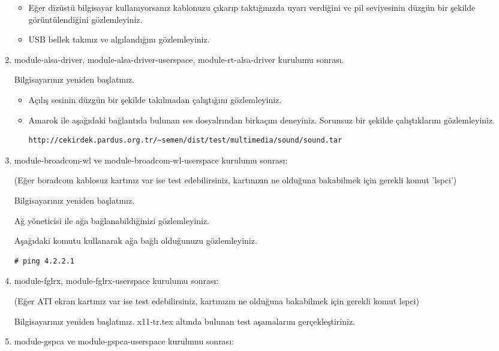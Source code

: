 \documentclass[a4paper,10pt]{article}
\begin{document}
\begin{enumerate}
\begin{itemize}
\item Eğer dizüstü bilgisayar kullanıyorsanız kablonuzu çıkarıp taktığınızda uyarı verdiğini ve pil seviyesinin düzgün bir şekilde görüntülendiğini gözlemleyiniz.
\item USB bellek takınız ve algılandığını gözlemleyiniz.
\end{itemize}

\item module-alsa-driver, module-alsa-driver-userspace, module-rt-alsa-driver kurulumu sonrası.

Bilgisayarınız yeniden başlatınız.
\begin{itemize}
\item Açılış sesinin düzgün bir şekilde takılmadan çalıştığını gözlemleyiniz.

\item Amarok ile aşağıdaki bağlantıda bulunan ses dosyalrından birkaçını deneyiniz. Sorunsuz bir şekilde çalıştıklarını gözlemleyiniz.
\begin{verbatim}
http://cekirdek.pardus.org.tr/~semen/dist/test/multimedia/sound/sound.tar 
\end{verbatim}

\end{itemize}

\item module-broadcom-wl ve module-broadcom-wl-userspace kurulumu sonrası: 

(Eğer boradcom kablosuz kartınız var ise test edebilirsiniz, kartınızın ne olduğuna bakabilmek için gerekli komut 'lspci')

Bilgisayarınız yeniden başlatınız.

Ağ yöneticisi ile ağa bağlanabildiğinizi gözlemleyiniz.

Aşağıdaki komutu kullanarak ağa bağlı olduğunuzu gözlemleyiniz.
\begin{verbatim}
# ping 4.2.2.1 
\end{verbatim}

\item module-fglrx, module-fglrx-userspace  kurulumu sonrası: 

(Eğer ATI ekran kartınız var ise test edebilirsiniz, kartınızın ne olduğuna bakabilmek için gerekli komut lspci)

Bilgisayarınız yeniden başlatınız. x11-tr.tex altında bulunan test aşamalarını gerçekleştiriniz.

\item module-gspca ve module-gspca-userspace kurulumu sonrası:


\end{enumerate}
\end{document}
